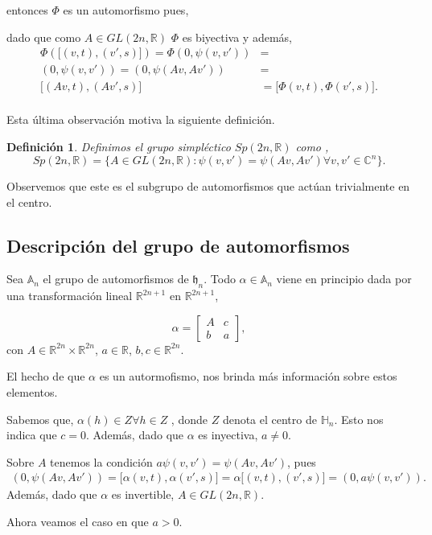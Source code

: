 \documentclass[12pt]{article}
\newtheorem{definition}{Definición}
\begin{document}
entonces $\Phi$ es un automorfismo pues,

dado que como $A \in GL(2n,\mathbb{R})$ $\Phi$ es biyectiva y además,
$$\begin{aligned}
\Phi({[}(v,t),(v',s){]})=\Phi(0,\psi(v,v'))&=\\
(0,\psi(v,v'))=(0,\psi(Av,Av'))&=\\
{[}(Av,t),(Av',s){]}&={[}\Phi(v,t),\Phi(v',s){]}.\\
\end{aligned}$$

Esta última observación motiva la siguiente definición. 
\begin{definition}
 Definimos el grupo simpléctico $Sp(2n,\mathbb{R})$ como ,
 $$
 Sp(2n,\mathbb{R})=\{ A \in GL(2n,\mathbb{R}): \psi(v,v')=\psi(Av,Av') \forall v,v' \in \mathbb{C}^n\}.
 $$
\end{definition}
Observemos que este es el subgrupo de automorfismos que actúan trivialmente en el centro.

\subsection{Descripción del grupo de automorfismos}
Sea $\mathbb{A}_n$ el grupo de automorfismos  de $\mathfrak{h}_n$.
Todo $\alpha \in \mathbb{A}_n$ viene en principio dada por una transformación lineal  $\mathbb{R}^{2n+1}$ en $\mathbb{R}^{2n+1}$,

$$\alpha=
\begin{bmatrix}
A & c\\
b & a
\end{bmatrix},$$
con $A \in  \mathbb{R}^{2n} \times \mathbb{R}^{2n}$, $a \in \mathbb{R}$, $b,c \in \mathbb{R}^{2n}$.

El hecho de que $\alpha$ es un autormofismo, nos brinda más información sobre estos elementos.

Sabemos que, $\alpha(h) \in Z \forall h \in Z$ , donde $Z$ denota el centro de $\mathbb{H}_n$.
Esto nos indica que $c=0$.
Además, dado que $\alpha$ es inyectiva, $a\neq0$.

Sobre $A$ tenemos la condición $a \psi(v,v')=\psi(A v,A v')$, pues
$$\begin{aligned}
(0,\psi(A v,A v'))={[}\alpha(v,t),\alpha(v',s){]}=\alpha{[}(v,t),(v',s){]}=(0,a \psi(v,v')).
\end{aligned}$$
Además, dado que $\alpha$ es invertible, $A \in GL(2n,\mathbb{R})$.

Ahora veamos el caso en que $a >0$.
\end{document}
